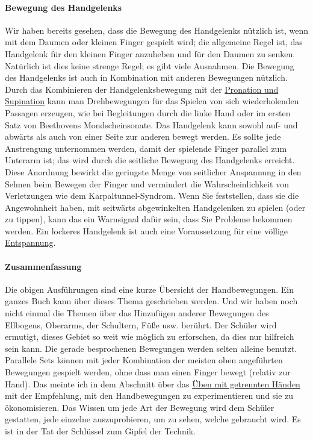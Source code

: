 \paragraph{Bewegung des Handgelenks}

Wir haben bereits gesehen, dass die Bewegung des Handgelenks nützlich ist, wenn mit dem Daumen oder kleinen Finger gespielt wird; die allgemeine Regel ist, das Handgelenk für den kleinen Finger anzuheben und für den Daumen zu senken.
Natürlich ist dies keine strenge Regel; es gibt viele Ausnahmen.
Die Bewegung des Handgelenks ist auch in Kombination mit anderen Bewegungen nützlich.
Durch das Kombinieren der Handgelenksbewegung mit der \hyperref[c1iii4ProSup]{Pronation und Supination} kann man Drehbewegungen für das Spielen von sich wiederholenden Passagen erzeugen, wie bei Begleitungen durch die linke Hand oder im ersten Satz von Beethovens Mondscheinsonate.
Das Handgelenk kann sowohl auf- und abwärts als auch von einer Seite zur anderen bewegt werden.
Es sollte jede Anstrengung unternommen werden, damit der spielende Finger parallel zum Unterarm ist; das wird durch die seitliche Bewegung des Handgelenks erreicht.
Diese Anordnung bewirkt die geringste Menge von seitlicher Anspannung in den Sehnen beim Bewegen der Finger und vermindert die Wahrscheinlichkeit von Verletzungen wie dem Karpaltunnel-Syndrom.
Wenn Sie feststellen, dass sie die Angewohnheit haben, mit seitwärts abgewinkelten Handgelenken zu spielen (oder zu tippen), kann das ein Warnsignal dafür sein, dass Sie Probleme bekommen werden.
Ein lockeres Handgelenk ist auch eine Voraussetzung für eine völlige \hyperref[c1ii14]{Entspannung}.


\paragraph{Zusammenfassung}

Die obigen Ausführungen sind eine kurze Übersicht der Handbewegungen.
Ein ganzes Buch kann über dieses Thema geschrieben werden.
Und wir haben noch nicht einmal die Themen über das Hinzufügen anderer Bewegungen des Ellbogens, Oberarms, der Schultern, Füße usw. berührt.
Der Schüler wird ermutigt, dieses Gebiet so weit wie möglich zu erforschen, da dies nur hilfreich sein kann.
Die gerade besprochenen Bewegungen werden selten alleine benutzt.
Parallele Sets können mit jeder Kombination der meisten oben angeführten Bewegungen gespielt werden, ohne dass man einen Finger bewegt (relativ zur Hand).
Das meinte ich in dem Abschnitt über das \hyperref[c1ii7]{Üben mit getrennten Händen} mit der Empfehlung, mit den Handbewegungen zu experimentieren und sie zu ökonomisieren.
Das Wissen um jede Art der Bewegung wird dem Schüler gestatten, jede einzelne auszuprobieren, um zu sehen, welche gebraucht wird.
Es ist in der Tat der Schlüssel zum Gipfel der Technik.



